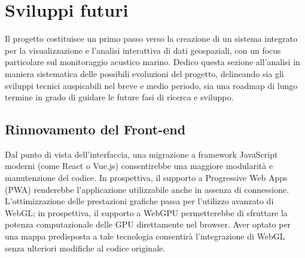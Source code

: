 \section{Sviluppi futuri}
\label{ss:sviluppi-futuri}

Il progetto costituisce un primo passo verso la creazione di un sistema integrato
per la visualizzazione e l'analisi interattiva di dati geospaziali, con un focus
particolare sul monitoraggio acustico marino. Dedico questa sezione all'analisi in
maniera sistematica delle possibili evoluzioni del progetto, delineando sia gli
sviluppi tecnici auspicabili nel breve e medio periodo, sia una roadmap di lungo
termine in grado di guidare le future fasi di ricerca e sviluppo.

\subsection{Rinnovamento del Front-end}
Dal punto di vista dell'interfaccia, una migrazione a framework JavaScript
moderni (come React o Vue.js) consentirebbe una maggiore modularità e
manutenzione del codice. In prospettiva, il supporto a Progressive Web Apps (PWA)
renderebbe l'applicazione utilizzabile anche in assenza di connessione. L'ottimizzazione
delle prestazioni grafiche passa per l'utilizzo avanzato di WebGL; in
prospettiva, il supporto a WebGPU permetterebbe di sfruttare la potenza computazionale
delle GPU direttamente nel browser. Aver optato per una mappa predisposta a tale
tecnologia consentirà l'integrazione di WebGL senza ulteriori modifiche al
codice originale.